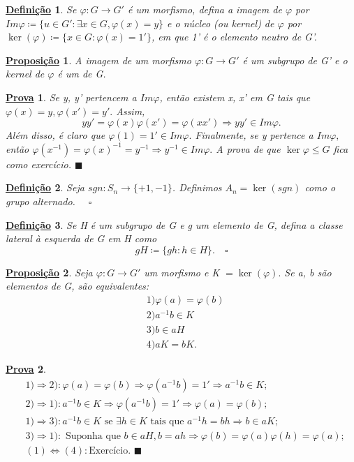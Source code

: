 \documentclass{article}
\newtheorem*{def*}{\underline{Defini\c c\~ao}}
\newtheorem*{prop*}{\underline{Proposi\c c\~ao}}
\newtheorem*{proof*}{\underline{Prova}}
\renewcommand\qedsymbol{$\blacksquare$}
\begin{document}
\begin{def*}
  Se $\varphi:G\rightarrow G'$ \'e um morfismo, defina a imagem de $\varphi$ por $Im \varphi\coloneqq\{u\in G': \exists x\in G, \varphi(x)=y\}$ 
  e o n\'ucleo (ou kernel) de $\varphi$ por $\ker{(\varphi)}\coloneqq\{x\in G: \varphi(x) = 1'\} $, em que 1' \'e o elemento neutro de G'.  
\end{def*}
\begin{prop*}
  A imagem de um morfismo $\varphi:G\rightarrow G'$ \'e um subgrupo de G' e o kernel de $\varphi$ \'e um de G.
\end{prop*}
\begin{proof*}
  Se y, y' pertencem a $Im\varphi$, ent\~ao existem x, x' em G tais que $\varphi(x) = y, \varphi(x')=y'.$ Assim, 
  $$
    yy' = \varphi(x)\varphi(x') = \varphi(xx') \Rightarrow yy'\in Im\varphi.
  $$
  Al\'em disso, \'e claro que $\varphi(1) = 1'\in Im\varphi.$ Finalmente, se y pertence a $Im \varphi,$ ent\~ao
 $\varphi(x^{-1}) = \varphi(x)^{-1} = y^{-1} \Rightarrow y^{-1}\in Im \varphi.$ A prova de que $\ker\varphi\leq{G}$ fica como
 exerc\'icio. \qedsymbol
\end{proof*}
\begin{def*}
  Seja $sgn:S_{n}\rightarrow \{+1, -1\}$. Definimos $A_{n} = \ker{(sgn)}$ como o grupo alternado. $\quad\square$
\end{def*}
\begin{def*}
  Se H \'e um subgrupo de G e g um elemento de G, defina a classe lateral \`a esquerda de G em H como
  $$
    gH\coloneqq \{gh: h\in H\}.\quad\square
  $$
\end{def*}
\begin{prop*}
  Seja $\varphi:G\rightarrow G'$ um morfismo e K $= \ker{(\varphi)}.$ Se a, b s\~ao elementos de G, s\~ao equivalentes:
 \begin{align*}
   &1) \varphi(a) = \varphi(b)\\
   &2) a^{-1}b\in K\\
   &3) b\in aH\\
   &4) aK = bK.
 \end{align*}
\end{prop*}
\begin{proof*}
  \begin{align*}
  &1)\Rightarrow2): \varphi(a) = \varphi(b) \Rightarrow \varphi(a^{-1}b) = 1' \Rightarrow a^{-1}b\in K;\\ 
  &2)\Rightarrow1): a^{-1}b\in K \Rightarrow \varphi(a^{-1}b) = 1' \Rightarrow \varphi(a)=\varphi(b);\\
  &1)\Rightarrow3): a^{-1}b\in K \text{ se } \exists h\in K \text{ tais que } a^{-1}h = bh \Rightarrow b\in aK;\\
  &3)\Rightarrow1): \text{ Suponha que }b\in aH, b = ah \Rightarrow \varphi(b) = \varphi(a)\varphi(h) = \varphi(a);\\
  &(1)\Longleftrightarrow(4): \text{Exerc\'icio. \qedsymbol}
  \end{align*}
\end{proof*}
\newpage
\end{document}
